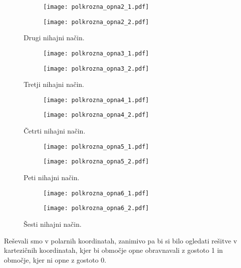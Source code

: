 \documentclass[12pt,a4paper]{article}
\begin{document}
\begin{figure}[H]
    \centering
    \begin{subfigure}[b]{0.49\textwidth}
        \texttt{[image: polkrozna\_opna2\_1.pdf]}
    \end{subfigure}
    \begin{subfigure}[b]{0.49\textwidth}
        \texttt{[image: polkrozna\_opna2\_2.pdf]}
    \end{subfigure}
    \caption{Drugi nihajni način.} \label{fig:slika28}
\end{figure}

\begin{figure}[H]
    \centering
    \begin{subfigure}[b]{0.49\textwidth}
        \texttt{[image: polkrozna\_opna3\_1.pdf]}
    \end{subfigure}
    \begin{subfigure}[b]{0.49\textwidth}
        \texttt{[image: polkrozna\_opna3\_2.pdf]}
    \end{subfigure}
    \caption{Tretji nihajni način.} \label{fig:slika29}
\end{figure}

\begin{figure}[H]
    \centering
    \begin{subfigure}[b]{0.49\textwidth}
        \texttt{[image: polkrozna\_opna4\_1.pdf]}
    \end{subfigure}
    \begin{subfigure}[b]{0.49\textwidth}
        \texttt{[image: polkrozna\_opna4\_2.pdf]}
    \end{subfigure}
    \caption{Četrti nihajni način.} \label{fig:slika30}
\end{figure}


\begin{figure}[H]
    \centering
    \begin{subfigure}[b]{0.49\textwidth}
        \texttt{[image: polkrozna\_opna5\_1.pdf]}
    \end{subfigure}
    \begin{subfigure}[b]{0.49\textwidth}
        \texttt{[image: polkrozna\_opna5\_2.pdf]}
    \end{subfigure}
    \caption{Peti nihajni način.} \label{fig:slika31}
\end{figure}

\begin{figure}[H]
    \centering
    \begin{subfigure}[b]{0.49\textwidth}
        \texttt{[image: polkrozna\_opna6\_1.pdf]}
    \end{subfigure}
    \begin{subfigure}[b]{0.49\textwidth}
        \texttt{[image: polkrozna\_opna6\_2.pdf]}
    \end{subfigure}
    \caption{Šesti nihajni način.} \label{fig:slika32}
\end{figure}

Reševali smo v polarnih koordinatah, zanimivo pa bi si bilo ogledati rešitve v kartezičnih koordinatah, kjer bi območje opne obravnavali z gostoto 1 in območje, kjer ni opne z gostoto 0.
\end{document}
